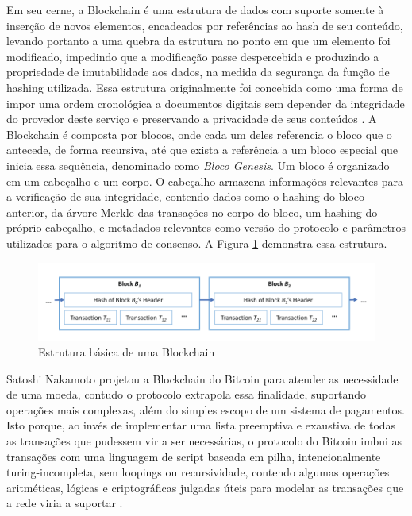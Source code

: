 \documentclass[a4paper,11pt]{article}
\begin{document}
Em seu cerne, a Blockchain é uma estrutura de dados com suporte somente à inserção de novos elementos, encadeados por referências ao hash de seu conteúdo, levando portanto a uma quebra da estrutura no ponto em que um elemento foi modificado, impedindo que a modificação passe despercebida e produzindo a propriedade de imutabilidade aos dados, na medida da segurança da função de hashing utilizada.
Essa estrutura originalmente foi concebida como uma forma de impor uma ordem cronológica a documentos digitais sem depender da integridade do provedor deste serviço e preservando a privacidade de seus conteúdos \cite{Haber1991}.
A Blockchain é composta por blocos, onde cada um deles referencia o bloco que o antecede, de forma recursiva, até que exista a referência a um bloco especial que inicia essa sequência, denominado como \emph{Bloco Genesis}.
Um bloco é organizado em um cabeçalho e um corpo.
O cabeçalho armazena informações relevantes para a verificação de sua integridade, contendo dados como o hashing do bloco anterior, da árvore Merkle das transações no corpo do bloco, um hashing do próprio cabeçalho, e metadados relevantes como versão do protocolo e parâmetros utilizados para o algoritmo de consenso.
A Figura \ref{fig:blockchain} demonstra essa estrutura.

\begin{figure}[htp]
    \centering
    \includegraphics[width=\textwidth]{images/exemplo-de-blockchain.png}
    \caption{Estrutura básica de uma Blockchain}
    \label{fig:blockchain}
\end{figure}

Satoshi Nakamoto projetou a Blockchain do Bitcoin para atender as necessidade de uma moeda, contudo o protocolo extrapola essa finalidade, suportando operações mais complexas, além do simples escopo de um sistema de pagamentos.
Isto porque, ao invés de implementar uma lista preemptiva e exaustiva de todas as transações que pudessem vir a ser necessárias, o protocolo do Bitcoin imbui as transações com uma linguagem de script baseada em pilha, intencionalmente turing-incompleta, sem loopings ou recursividade, contendo algumas operações aritméticas, lógicas e criptográficas julgadas úteis para modelar as transações que a rede viria a suportar \cite{Narayanan2016a}.
\end{document}
